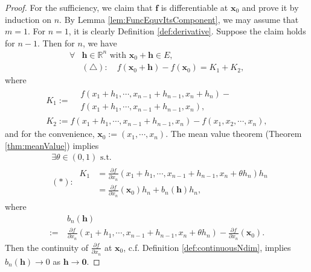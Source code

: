 \begin{proof}
  For the sufficiency,
  we claim that $\mathbf{f}$ is differentiable at $\mathbf{x}_{0}$ and
  prove it by induction on $n$. By Lemma \ref{lem:FuncEquvItsComponent},
  we may assume that $m=1$.
  For $n=1$, it is clearly Definition \ref{def:derivative}.
  Suppose the claim holds for $n-1$. Then for $n$, we have
  \begin{align*}
    \forall &\mathbf{h}\in \mathbb{R}^{n}\text{ with }
              \mathbf{x}_{0}+\mathbf{h}\in E,\\
    &(\triangle):\quad
    f(\mathbf{x}_{0}+\mathbf{h})-f(\mathbf{x}_{0})
    =K_{1}+K_{2},
  \end{align*}
  where
  \begin{displaymath}
    \begin{array}{l}
      K_{1}:=
      \begin{array}{ll}
        &f(x_{1}+h_{1},\cdots,x_{n-1}+h_{n-1},x_{n}+h_{n})-\\
        &f(x_{1}+h_{1},\cdots,x_{n-1}+h_{n-1},x_{n}),
      \end{array}\\
       K_{2}:=f(x_{1}+h_{1},\cdots,x_{n-1}+h_{n-1},x_{n})-
           f(x_{1},x_{2},\cdots,x_{n}),
    \end{array}
  \end{displaymath}
  and for the convenience, $\mathbf{x}_{0}:=(x_{1},\cdots, x_{n})$.
  The mean value theorem (Theorem \ref{thm:meanValue}) implies
  \begin{align*}
    &\ \exists \theta\in (0,1)\text{ s.t. }\\
    &\ (*):\
    \begin{array}{ll}
       K_{1}
    &=\frac{\partial f}{\partial x_{n}}(x_{1}+h_{1},\cdots,
      x_{n-1}+h_{n-1},x_{n}+\theta h_{n})h_{n}\\
    &=\frac{\partial f}{\partial x_{n}}(\mathbf{x}_{0})h_{n}
      +b_{n}(\mathbf{h})h_{n},
    \end{array}
  \end{align*}
  where
  \begin{align*}
    &\ b_{n}(\mathbf{h})\\
    :=&\ \frac{\partial f}{\partial x_{n}}(x_{1}+h_{1},\cdots,
    x_{n-1}+h_{n-1},x_{n}+\theta h_{n})-
    \frac{\partial f}{\partial x_{n}}(\mathbf{x}_{0}).
  \end{align*}
  Then the continuity of $\frac{\partial f}{\partial x_{n}}$
  at $\mathbf{x}_{0}$, c.f. Definition \ref{def:continuousNdim}, implies
  $b_{n}(\mathbf{h})\rightarrow 0$ as $\mathbf{h}\rightarrow \mathbf{0}$.   

\end{proof}
